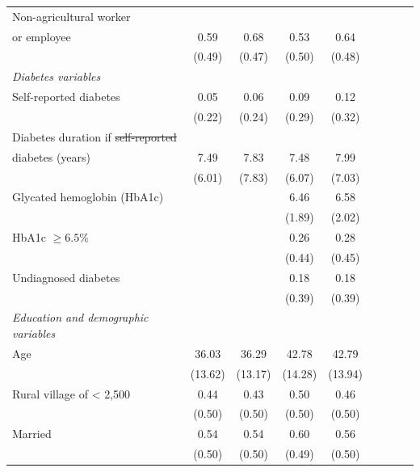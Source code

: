 \documentclass[12pt,english]{article}
\providecommand{\DIFaddtex}[1]{{\protect\color{blue}\uwave{#1}}} %
\providecommand{\DIFdeltex}[1]{{\protect\color{red}\sout{#1}}}                      %
\providecommand{\DIFaddFL}[1]{\DIFadd{#1}} %
\providecommand{\DIFdelFL}[1]{\DIFdel{#1}} %
\providecommand{\DIFaddbeginFL}{} %
\providecommand{\DIFaddendFL}{} %
\providecommand{\DIFdelbeginFL}{} %
\providecommand{\DIFdelendFL}{} %
\providecommand{\DIFadd}[1]{\texorpdfstring{\DIFaddtex{#1}}{#1}} %
\providecommand{\DIFdel}[1]{\texorpdfstring{\DIFdeltex{#1}}{}} %
\begin{document}
\begin{table}[p]
\begin{adjustbox}{max width=\linewidth, center}
\begin{threeparttable}
{\begin{tabular}{l*{4}{SS}}
Non-agricultural worker \DIFaddbeginFL &&&&\\
\DIFaddendFL or employee& 0.59&        0.68&        0.53&        0.64\\
                    &      (0.49)&      (0.47)&      (0.50)&      (0.48)\\
\hspace*{10mm}\emph{Diabetes variables} \\
Self-reported diabetes  &         0.05&        0.06&        0.09&        0.12\\
                    &      (0.22)&      (0.24)&      (0.29)&      (0.32)\\
Diabetes duration if \DIFdelbeginFL \DIFdelFL{self-reported }\DIFdelendFL \DIFaddbeginFL \DIFaddFL{self- }&&&&\\
\DIFaddFL{reported }\DIFaddendFL diabetes (years)   &        7.49&        7.83&        7.48&        7.99\\
                    &      (6.01)&      (7.83)&      (6.07)&      (7.03)\\
Glycated hemoglobin (HbA1c)&            &            &       6.46&        6.58\\
                    &            &            &      (1.89)&      (2.02)\\
HbA1c $\geq 6.5\%$  &            &            &        0.26&        0.28\\
                    &            &            &      (0.44)&      (0.45)\\
Undiagnosed diabetes&            &            &        0.18&        0.18\\
                    &            &            &      (0.39)&      (0.39)\\
\hspace*{10mm}\emph{Education and demographic variables} \\
Age                 &       36.03&       36.29&       42.78&       42.79\\
                    &     (13.62)&     (13.17)&     (14.28)&     (13.94)\\
Rural village of < 2,500&        0.44&        0.43&        0.50&        0.46\\
                    &      (0.50)&      (0.50)&      (0.50)&      (0.50)\\
Married             &        0.54&        0.54&        0.60&        0.56\\
                    &      (0.50)&      (0.50)&      (0.49)&      (0.50)\\

\end{tabular}}
\end{threeparttable}
\end{adjustbox}
\end{table}
\end{document}
